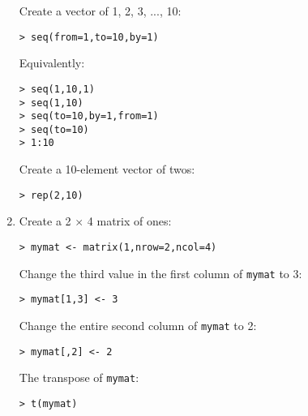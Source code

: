 \documentclass[11pt]{article}
\begin{document}
\begin{enumerate}
Create a vector of 1, 2, 3, ..., 10:

\begin{verbatim}
> seq(from=1,to=10,by=1)
\end{verbatim}

Equivalently:

\begin{verbatim}
> seq(1,10,1)
> seq(1,10)
> seq(to=10,by=1,from=1)
> seq(to=10)
> 1:10
\end{verbatim}

Create a 10-element vector of twos:

\begin{verbatim}
> rep(2,10)
\end{verbatim}

\item Create a 2 $\times$ 4 matrix of ones:

\begin{verbatim}
> mymat <- matrix(1,nrow=2,ncol=4)
\end{verbatim}

Change the third value in the first column of \texttt{mymat} to 3:

\begin{verbatim}
> mymat[1,3] <- 3
\end{verbatim}

Change the entire second column of \texttt{mymat} to 2:

\begin{verbatim}
> mymat[,2] <- 2
\end{verbatim}

The transpose of \texttt{mymat}:

\begin{verbatim}
> t(mymat)
\end{verbatim}


\end{enumerate}
\end{document}
